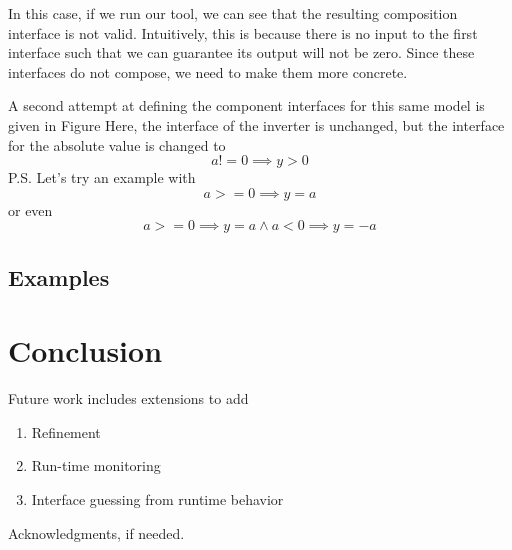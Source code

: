 \documentclass[preprint,11pt,authoryear]{sigplanconf}
\begin{document}
In this case, if we run our tool, we can see that the resulting composition interface is not valid.  Intuitively, this is because there is no input to the first interface such that we can guarantee its output will not be zero.  Since these interfaces do not compose, we need to make them more concrete.

A second attempt at defining the component interfaces for this same model is given in Figure%
Here, the interface of the inverter is unchanged, but the interface for the absolute value is changed to
\[
a != 0 \implies y > 0
\]
P.S. Let's try an example with \[ a >= 0 \implies y = a\] or even \[a >= 0 \implies y = a  \wedge a < 0 \implies y = -a\]

\subsection{Examples}

\section{Conclusion}
Future work includes extensions to add
\begin{enumerate}
	\item Refinement
	\item Run-time monitoring
	\item Interface guessing from runtime behavior
\end{enumerate}

\acks

Acknowledgments, if needed.




\end{document}
